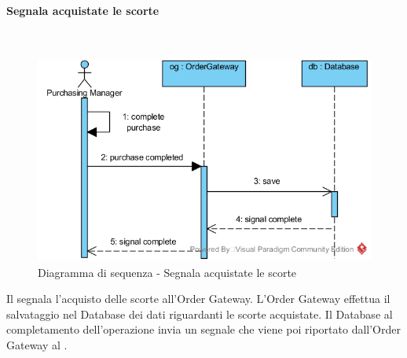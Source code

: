 \begin{samepage}
\paragraph{Segnala acquistate le scorte}\mbox{}\\
\end{samepage}
\begin{figure}[H]
	\centering
	\includegraphics[width=15cm]{../../documenti/SpecificaTecnica/diagrammi_img/sequenza/responsabile_acquisti_segnala_scorte_acquistate.png}
	\caption{Diagramma di sequenza - Segnala acquistate le scorte}
\end{figure}
Il \Purchasingmanager{} segnala l'acquisto delle scorte all'Order Gateway. L'Order Gateway effettua il salvataggio nel Database dei dati riguardanti le scorte acquistate. Il Database al completamento dell'operazione invia un segnale che viene poi riportato dall'Order Gateway al \Purchasingmanager{}.

\subsubsection{\Manager{}}

